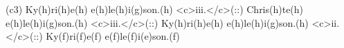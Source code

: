 (c3) Ky(h)ri(h)e(h) e(h)le(h)i(g)son.(h) <c>iii.</c>(::) Chris(h)te(h) e(h)le(h)i(g)son.(h) <c>iii.</c>(::) Ky(h)ri(h)e(h) e(h)le(h)i(g)son.(h) <c>ii.</c>(::) Ky(f)ri(f)e(f) e(f)le(f)i(e)son.(f)